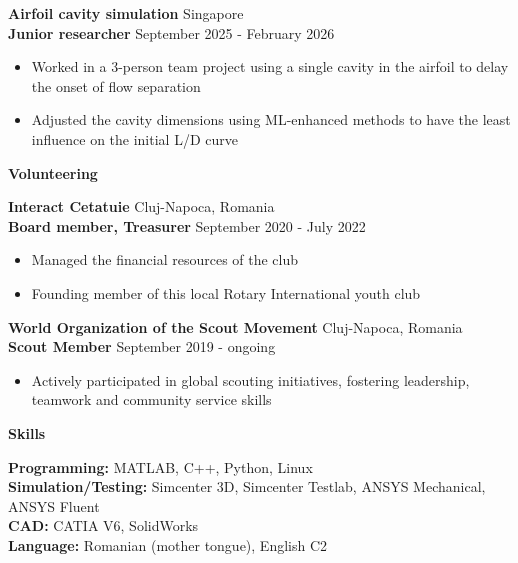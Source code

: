\documentclass[11pt]{article}
\newcommand{\cvsection}[1]{%
  \vspace{16pt}%
  \centerline{\textbf{#1}}%
  \vspace{8pt}%
}
\newcommand{\cvrole}[4]{%
  \textbf{#1} \hfill #2 \\
  \textbf{#3} \hfill #4\par
}
\newcommand{\cvgap}{\vspace{0.7em}}
\begin{document}
\cvrole{Airfoil cavity simulation}{Singapore}{Junior researcher}{September 2025 - February 2026}
\begin{itemize}
  \item Worked in a 3-person team project using a single cavity in the airfoil to delay the onset of flow separation
  \item Adjusted the cavity dimensions using ML-enhanced methods to have the least influence on the initial L/D curve
\end{itemize}

\cvsection{Volunteering}

\cvrole{Interact Cetatuie}{Cluj-Napoca, Romania}{Board member, Treasurer}{September 2020 - July 2022}
\begin{itemize}
  \item Managed the financial resources of the club
  \item Founding member of this local Rotary International youth club
\end{itemize}
\cvgap

\cvrole{World Organization of the Scout Movement}{Cluj-Napoca, Romania}{Scout Member}{September 2019 - ongoing}
\begin{itemize}
  \item Actively participated in global scouting initiatives, fostering leadership, teamwork and community service skills
\end{itemize}

\vspace{-8pt}
\cvsection{Skills}

\textbf{Programming:} MATLAB, C++, Python, Linux \\
\textbf{Simulation/Testing:} Simcenter 3D, Simcenter Testlab, ANSYS Mechanical, ANSYS Fluent \\
\textbf{CAD:} CATIA V6, SolidWorks \\
\textbf{Language:} Romanian (mother tongue), English C2
\end{document}

